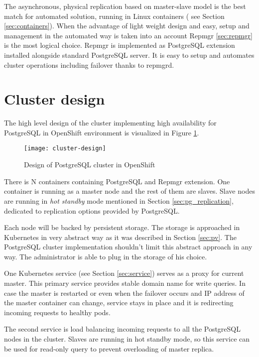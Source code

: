 \documentclass[
  digital, %
  twoside, %
  table,   %
  lof,     %
  lot,     %
]{fithesis3}
\begin{document}
The asynchronous, physical replication based on master-slave model is the best match for automated solution, running in Linux containers ( see Section \ref{sec:containers}). When the advantage of light weight design and easy, setup and management in the automated way is taken into an account Repmgr \ref{sec:repmgr} is the most logical choice. Repmgr is implemented as PostgreSQL extension installed alongside standard PostgreSQL server. It is easy to setup and automates cluster operations including failover thanks to repmgrd.

\section{Cluster design}
The high level design of the cluster implementing high availability for PostgreSQL in OpenShift environment is visualized in Figure \ref{fig:cluster-design}.

\begin{figure}[H]
\caption{Design of PostgreSQL cluster in OpenShift}
\centering
\texttt{[image: cluster-design]}
\label{fig:cluster-design}
\end{figure}

There is N containers containing PostgreSQL and Repmgr extension. One container is running as a master node and the rest of them are slaves. Slave nodes are running in \textit{hot standby} mode mentioned in Section \ref{sec:pg_replication}, dedicated to replication options provided by PostgreSQL.

Each node will be backed by persistent storage. The storage is approached in Kubernetes in very abstract way as it was described in Section \ref{sec:pv}. The PostgreSQL cluster implementation shouldn't limit this abstract approach in any way. The administrator is able to plug in the storage of his choice.

One Kubernetes service (see Section \ref{sec:service}) serves as a proxy for current master. This primary service provides stable domain name for write queries. In case the master is restarted or even when the failover occurs and IP address of the master container can change, service stays in place and it is redirecting incoming requests to healthy pods.

The second service is load balancing incoming requests to all the PostgreSQL nodes in the cluster. Slaves are running in hot standby mode, so this service can be used for read-only query to prevent overloading of master replica.
\end{document}

